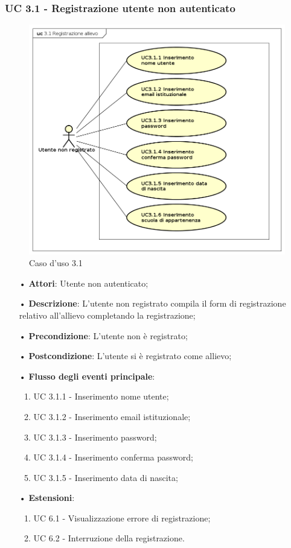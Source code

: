 \subsubsection{UC 3.1 - Registrazione utente non autenticato}
\begin{figure}[H]
	\centering
	\includegraphics[width=17cm]{img/UC31.png} 
	\caption{Caso d'uso 3.1}\label{fig:31}
\end{figure}
\begin{itemize}
	\item[•]\textbf{Attori}: Utente non autenticato;
	\item[•]\textbf{Descrizione}: L’utente non registrato compila il form di registrazione relativo all’allievo completando la registrazione;
	\item[•]\textbf{Precondizione}: L’utente non è registrato;
	\item[•]\textbf{Postcondizione}: L’utente si è registrato come allievo;
	\item[•]\textbf{Flusso degli eventi principale}:
	\begin{enumerate}
		\item UC 3.1.1 - Inserimento nome utente;
		\item UC 3.1.2 - Inserimento email istituzionale;
		\item UC 3.1.3 - Inserimento password;
		\item UC 3.1.4 - Inserimento conferma password;
		\item UC 3.1.5 - Inserimento data di nascita;
	\end{enumerate}
	\item[•]\textbf{Estensioni}:
	\begin{enumerate}
		\item UC 6.1 - Visualizzazione errore di registrazione;
		\item UC 6.2 - Interruzione della registrazione.
	\end{enumerate}
\end{itemize}

